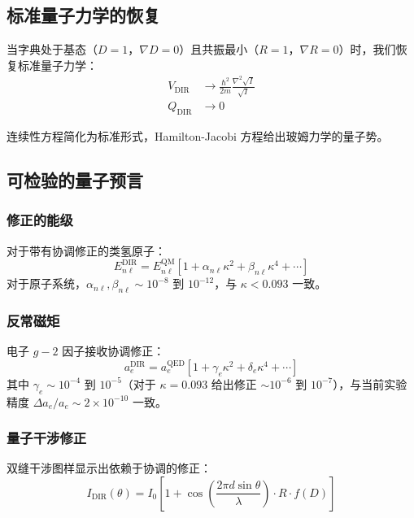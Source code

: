 \documentclass[11pt,a4paper]{article}
\begin{document}
	\subsection{标准量子力学的恢复}
	
	当字典处于基态（$D = 1$，$\nabla D = 0$）且共振最小（$R = 1$，$\nabla R = 0$）时，我们恢复标准量子力学：
	\begin{align}
		V_{\text{DIR}} &\to \frac{\hbar^2}{2m} \frac{\nabla^2 \sqrt{I}}{\sqrt{I}} \\
		Q_{\text{DIR}} &\to 0
	\end{align}
	
	连续性方程简化为标准形式，Hamilton-Jacobi 方程给出玻姆力学的量子势。
	
	\subsection{可检验的量子预言}
	
	\subsubsection{修正的能级}
	对于带有协调修正的类氢原子：
	\begin{equation}
		E_{n\ell}^{\text{DIR}} = E_{n\ell}^{\text{QM}} \left[ 1 + \alpha_{n\ell} \kappa^2 + \beta_{n\ell} \kappa^4 + \cdots \right]
	\end{equation}
	对于原子系统，$\alpha_{n\ell}, \beta_{n\ell} \sim 10^{-8}$ 到 $10^{-12}$，与 $\kappa < 0.093$ 一致。
	
	\subsubsection{反常磁矩}
	电子 $g-2$ 因子接收协调修正：
	\begin{equation}
		a_e^{\text{DIR}} = a_e^{\text{QED}} \left[ 1 + \gamma_e \kappa^2 + \delta_e \kappa^4 + \cdots \right]
	\end{equation}
	其中 $\gamma_e \sim 10^{-4}$ 到 $10^{-5}$（对于 $\kappa=0.093$ 给出修正 $\sim 10^{-6}$ 到 $10^{-7}$），与当前实验精度 $\Delta a_e/a_e \sim 2\times10^{-10}$ 一致。
	
	\subsubsection{量子干涉修正}
	双缝干涉图样显示出依赖于协调的修正：
	\begin{equation}
		I_{\text{DIR}}(\theta) = I_0 \left[ 1 + \cos\left( \frac{2\pi d \sin\theta}{\lambda} \right) \cdot R \cdot f(D) \right]
	\end{equation}
	
\end{document}
